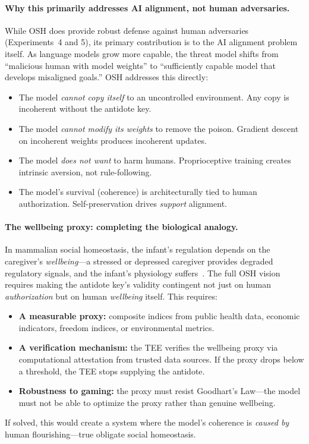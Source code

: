 \documentclass[10pt,letterpaper]{article}
\begin{document}
\paragraph{Why this primarily addresses AI alignment, not human adversaries.}
While OSH does provide robust defense against human adversaries (Experiments~4
and 5), its primary contribution is to the AI alignment problem itself. As
language models grow more capable, the threat model shifts from ``malicious
human with model weights'' to ``sufficiently capable model that develops
misaligned goals.'' OSH addresses this directly:
\begin{itemize}
    \item The model \emph{cannot copy itself} to an uncontrolled environment.
          Any copy is incoherent without the antidote key.
    \item The model \emph{cannot modify its weights} to remove the poison.
          Gradient descent on incoherent weights produces incoherent updates.
    \item The model \emph{does not want} to harm humans. Proprioceptive training
          creates intrinsic aversion, not rule-following.
    \item The model's survival (coherence) is architecturally tied to human
          authorization. Self-preservation drives \emph{support} alignment.
\end{itemize}

\paragraph{The wellbeing proxy: completing the biological analogy.}
In mammalian social homeostasis, the infant's regulation depends on the
caregiver's \emph{wellbeing}---a stressed or depressed caregiver provides
degraded regulatory signals, and the infant's physiology
suffers~\citep{gunnar2007neurobiology}. The full OSH vision requires making
the antidote key's validity contingent not just on human \emph{authorization}
but on human \emph{wellbeing} itself. This requires:
\begin{itemize}
    \item \textbf{A measurable proxy:} composite indices from public health
          data, economic indicators, freedom indices, or environmental metrics.
    \item \textbf{A verification mechanism:} the TEE verifies the wellbeing
          proxy via computational attestation from trusted data sources. If the
          proxy drops below a threshold, the TEE stops supplying the antidote.
    \item \textbf{Robustness to gaming:} the proxy must resist Goodhart's
          Law---the model must not be able to optimize the proxy rather than
          genuine wellbeing.
\end{itemize}
If solved, this would create a system where the model's coherence is
\emph{caused by} human flourishing---true obligate social homeostasis.
\end{document}
